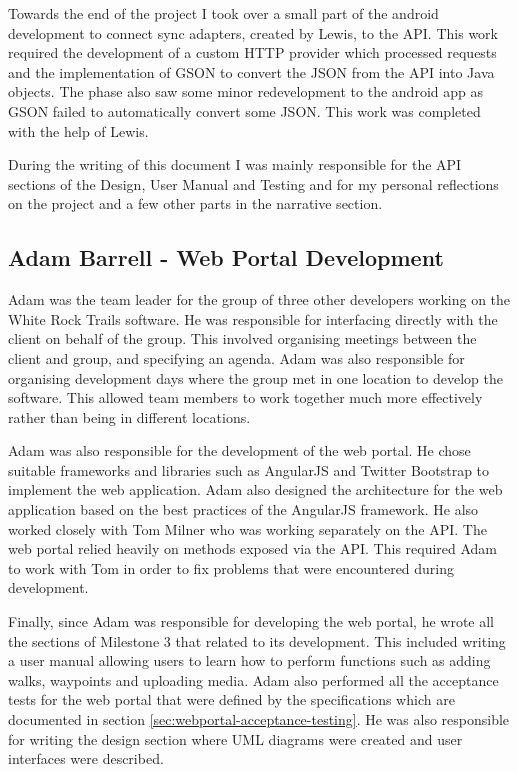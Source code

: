 \documentclass[11pt,a4paper]{report}
\begin{document}
Towards the end of the project I took over a small part of the android development to connect sync adapters, created by Lewis, to the API. This work required the development of a custom HTTP provider which processed requests and the implementation of GSON to convert the JSON from the API into Java objects. The phase also saw some minor redevelopment to the android app as GSON failed to automatically convert some JSON. This work was completed with the help of Lewis. 

During the writing of this document I was mainly responsible for the API sections of the Design, User Manual and Testing and for my personal reflections on the project and a few other parts in the narrative section. 

\subsection{Adam Barrell - Web Portal Development}
Adam was the team leader for the group of three other developers working on the White Rock Trails software. He was responsible for interfacing directly with the client on behalf of the group. This involved organising meetings between the client and group, and specifying an agenda. Adam was also responsible for organising development days where the group met in one location to develop the software. This allowed team members to work together much more effectively rather than being in different locations.

Adam was also responsible for the development of the web portal. He chose suitable frameworks and libraries such as AngularJS and Twitter Bootstrap to implement the web application. Adam also designed the architecture for the web application based on the best practices of the AngularJS framework. He also worked closely with Tom Milner who was  working separately on the API. The web portal relied heavily on methods exposed via the API. This required Adam to work with Tom in order to fix problems that were encountered during development.

Finally, since Adam was responsible for developing the web portal, he wrote all the sections of Milestone 3 that related to its development. This included writing a user manual allowing users to learn how to perform functions such as adding walks, waypoints and uploading media. Adam also performed all the acceptance tests for the web portal that were defined by the specifications which are documented in section \ref{sec:webportal-acceptance-testing}. He was also responsible for writing the design section where UML diagrams were created and user interfaces were described.
\end{document}
